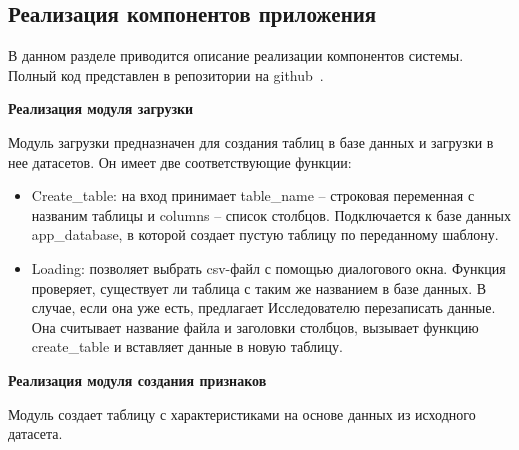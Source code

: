 \subsection{Реализация компонентов приложения}
\label{subsec:Components}
В данном разделе приводится описание реализации компонентов системы. Полный код представлен в репозитории на github~\cite{git}.

\textbf{Реализация модуля загрузки}

Модуль загрузки предназначен для создания таблиц в базе данных и загрузки в нее датасетов. Он имеет две соответствующие функции:

\begin{itemize}[itemindent=2cm, leftmargin=0cm, labelsep=0.3cm, topsep=0cm, itemsep=0cm, parsep=0cm, before=\vspace{-0.15cm}, after=\vspace{-0.15cm}]
    \item Create\_table: на вход принимает table\_name -- строковая переменная с названим таблицы и columns -- список столбцов. Подключается к базе данных app\_database, в которой создает пустую таблицу по переданному шаблону.
    \item Loading: позволяет выбрать csv-файл с помощью диалогового окна. Функция проверяет, существует ли таблица с таким же названием в базе данных. В случае, если она уже есть, предлагает Исследователю перезаписать данные. Она считывает название файла и заголовки столбцов, вызывает функцию create\_table и вставляет данные в новую таблицу.
\end{itemize}


\textbf{Реализация модуля создания признаков}

Модуль создает таблицу с характеристиками на основе данных из исходного датасета. 

